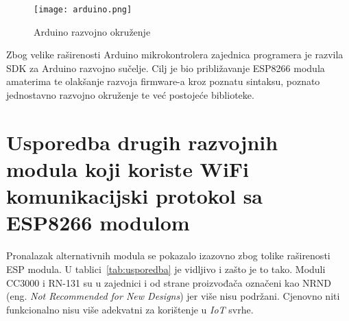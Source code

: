 \documentclass[times, utf8, zavrsni]{fer}
\begin{document}
{\begin{figure}[h]
    \centering
    \texttt{[image: arduino.png]}
    \caption{Arduino razvojno okruženje}
\end{figure}

Zbog velike raširenosti Arduino mikrokontrolera zajednica programera je razvila SDK za Arduino razvojno sučelje.
Cilj je bio približavanje ESP8266 modula amaterima te olakšanje razvoja firmware-a kroz poznatu sintaksu, poznato jednostavno razvojno okruženje te već postojeće biblioteke.

\section{Usporedba drugih razvojnih modula koji koriste WiFi komunikacijski protokol sa ESP8266 modulom}
Pronalazak alternativnih modula se pokazalo izazovno zbog tolike raširenosti ESP modula.
U tablici~\ref{tab:usporedba} je vidljivo i zašto je to tako.
Moduli CC3000 i RN-131 su u zajednici i od strane proizvođača označeni kao NRND (eng. \textit{Not Recommended for New Designs}) jer više nisu podržani.
Cjenovno niti funkcionalno nisu više adekvatni za korištenje u \textit{IoT} svrhe.

}
\end{document}
